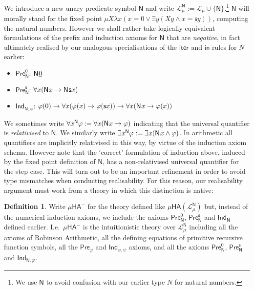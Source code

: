 \documentclass[10pt,a4paper]{amsart}
\theoremstyle{plain}
\theoremstyle{definition}
\newtheorem{definition}[definition]{Definition}
\renewcommand{\phi}{\varphi}
\newcommand{\dfn}{:=}
\theoremstyle{plain}
\theoremstyle{definition} %
\renewcommand{\succ}{\mathsf s}
\newcommand{\numeral}[1]{\underline{#1}}
\newcommand{\nat}{\mathit{N}}
\newcommand{\iter}[1]{\mathsf{iter}_{#1}}
\newcommand{\inj}{\mathsf{in}}
\renewcommand{\lor}{\vee}
\renewcommand{\land}{\wedge}
\newcommand{\limp}{\to}
\newcommand{\Lang}{\mathcal L}
\newcommand{\lang}[1]{\Lang_{#1}}
\newcommand{\langmuarith}{\lang \mu}
\newcommand{\HA}{\mathsf{HA}}
\newcommand{\muHA}{\mu\HA}
\newcommand{\preaxiom}{\mathsf{Pre}}
\newcommand{\indaxiom}{\mathsf{Ind}}
\newcommand{\pNat}{\mathsf{N}}
\newcommand{\pnat}[1]{\pNat\hspace{.05em} #1 }
\newcommand{\muHAneg}{\muHA^-}
\begin{document}
We introduce a new unary predicate symbol $\pNat $ and write $\langmuarith^\pNat \dfn \langmuarith \cup \{\pNat\}$.\footnote{We use $\pNat$ to avoid confusion with our earlier type $\nat $ for natural numbers.}
$\pNat$ will morally stand for the fixed point $ \mu X\lambda x (x=0 \lor \exists y (Xy \land x=\succ y))$, computing the natural numbers.
However we shall rather take logically equivalent formulations of the prefix and induction axioms for $\pNat$ that are \emph{negative}, in fact ultimately realised by our analogous specialisations of the $\iter{}$ and $\inj{}$ rules for $\nat$ earlier:
\begin{itemize}
    \item $\preaxiom_\pNat^0$: $\pnat \numeral 0$
    \item $\preaxiom_\pNat^\succ$: $\forall x (\pnat x \limp \pnat{ \succ x})$
    \item $\indaxiom_{\pNat,\phi}$:
    $\phi(0) \limp \forall x (\phi(x) \limp \phi(\succ x )) \limp \forall x (\pnat x \limp \phi(x))$
\end{itemize}

We sometimes write $\forall x^\pNat \phi \dfn \forall x (\pnat x \limp \phi)$ indicating that the universal quantifier is \emph{relativised} to $\pNat$.
We similarly write $\exists x^{\pNat} \phi \dfn \exists x (\pnat x \land \phi)$.
In arithmetic all quantifiers are implicitly relativised in this way, by virtue of the induction axiom schema.
However note that the `correct' formulation of induction above, induced by the fixed point definition of $\pNat$, has a non-relativised universal quantifier for the step case. 
This will turn out to be an important refinement in order to avoid type mismatches when conducting realisability. 
For this reason, our realisability argument must work from a theory in which this distinction is native:

\begin{definition}
    Write $\muHAneg$ for the theory defined like $\muHA(\langmuarith^\pNat)$ but, instead of the numerical induction axioms, we include the axioms $\preaxiom_\pNat^0$, $\preaxiom_\pNat^\succ$ and $\indaxiom_\pNat$ defined earlier.
    I.e.\ $\muHAneg$ is the intuitionistic theory over $\langmuarith^\pNat$ including all the axioms of Robinson Arithmetic, all the defining equations of primitive recursive function symbols, all the $\preaxiom_\phi$ and $\indaxiom_{\phi,\psi}$ axioms,  and all the axioms $\preaxiom_\pNat^0$, $\preaxiom_\pNat^\succ$ and $\indaxiom_{\pNat,\phi}$.
\end{definition}
\end{document}
